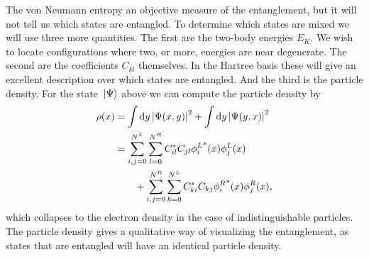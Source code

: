 \documentclass[twocolumn,superscriptaddress,unsortedaddress,
 amsmath,amssymb,
 aps,
]{revtex4-2}
\begin{document}
        The von Neumann entropy an objective measure of
        the entanglement, but it will not tell us which
        states are entangled.
        To determine which states are mixed we will use
        three more quantities.
        The first are the two-body energies $E_K$.
        We wish to locate configurations where two, or
        more, energies are near degenerate.
        The second are the coefficients $C_{kl}$
        themselves.
        In the Hartree basis these will give an excellent
        description over which states are entangled.
        And the third is the particle density.
        For the state $\ket*{\Psi}$ above we can compute
        the particle density by
        \begin{align*}
            \rho(x)
            &= \int \dd{y} \abs{\Psi(x, y)}^2
            + \int \dd{y} \abs{\Psi(y, x)}^2
            \\
            &= \sum_{i, j = 0}^{N^L}
            \sum_{l = 0}^{N^R} C^{*}_{il} C_{jl}
            {\phi^{L}_{i}}^{*}(x) \phi^L_{j}(x)
            \nonumber \\
            &\qquad
            + \sum_{i, j = 0}^{N^R}
            \sum_{k = 0}^{N^L} C^{*}_{ki} C_{kj}
            {\phi^{R}_{i}}^{*}(x) \phi^R_{j}(x),
        \end{align*}
        which collapses to the electron density in the
        case of indistinguishable particles.
        The particle density gives a qualitative way
        of visualizing the entanglement, as states that
        are entangled will have an identical particle
        density.
\end{document}
